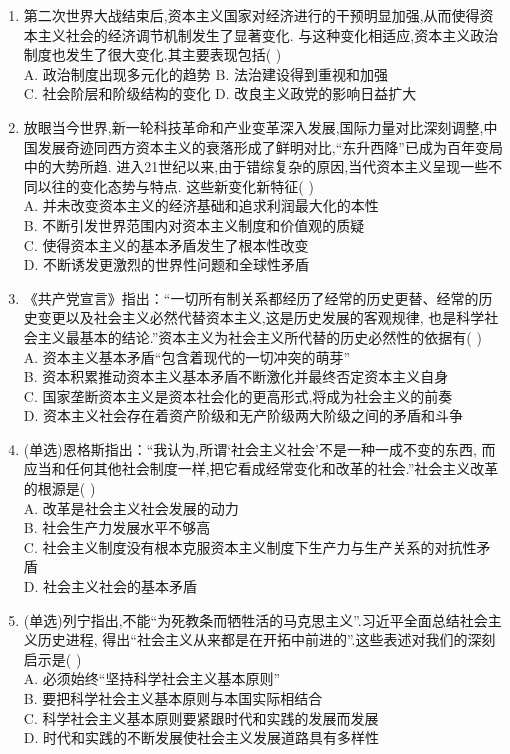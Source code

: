 \documentclass[12pt, a4paper, oneside, UTF8]{ctexbook}
\begin{document}
\begin{enumerate}
    \item 第二次世界大战结束后,资本主义国家对经济进行的干预明显加强,从而使得资本主义社会的经济调节机制发生了显著变化.
    与这种变化相适应,资本主义政治制度也发生了很大变化.其主要表现包括(   ) \\
    A. 政治制度出现多元化的趋势 \qquad
    B. 法治建设得到重视和加强 \\
    C. 社会阶层和阶级结构的变化 \qquad
    D. 改良主义政党的影响日益扩大

    \item 放眼当今世界,新一轮科技革命和产业变革深入发展,国际力量对比深刻调整,中国发展奇迹同西方资本主义的衰落形成了鲜明对比,“东升西降”已成为百年变局中的大势所趋.
    进入21世纪以来,由于错综复杂的原因,当代资本主义呈现一些不同以往的变化态势与特点.
    这些新变化新特征(   ) \\
    A. 并未改变资本主义的经济基础和追求利润最大化的本性\\
    B. 不断引发世界范围内对资本主义制度和价值观的质疑\\
    C. 使得资本主义的基本矛盾发生了根本性改变\\
    D. 不断诱发更激烈的世界性问题和全球性矛盾

    \item 《共产党宣言》指出：“一切所有制关系都经历了经常的历史更替、经常的历史变更以及社会主义必然代替资本主义,这是历史发展的客观规律,
    也是科学社会主义最基本的结论.”资本主义为社会主义所代替的历史必然性的依据有(   ) \\
    A. 资本主义基本矛盾“包含着现代的一切冲突的萌芽” \\
    B. 资本积累推动资本主义基本矛盾不断激化并最终否定资本主义自身 \\
    C. 国家垄断资本主义是资本社会化的更高形式,将成为社会主义的前奏 \\
    D. 资本主义社会存在着资产阶级和无产阶级两大阶级之间的矛盾和斗争

    \item (单选)恩格斯指出：“我认为,所谓‘社会主义社会’不是一种一成不变的东西,
    而应当和任何其他社会制度一样,把它看成经常变化和改革的社会.”社会主义改革的根源是(   ) \\
    A. 改革是社会主义社会发展的动力 \\
    B. 社会生产力发展水平不够高 \\
    C. 社会主义制度没有根本克服资本主义制度下生产力与生产关系的对抗性矛盾 \\
    D. 社会主义社会的基本矛盾 

    \item (单选)列宁指出,不能“为死教条而牺牲活的马克思主义”.习近平全面总结社会主义历史进程,
    得出“社会主义从来都是在开拓中前进的”.这些表述对我们的深刻启示是(   ) \\
    A. 必须始终“坚持科学社会主义基本原则” \\
    B. 要把科学社会主义基本原则与本国实际相结合 \\
    C. 科学社会主义基本原则要紧跟时代和实践的发展而发展 \\
    D. 时代和实践的不断发展使社会主义发展道路具有多样性


\end{enumerate}
\end{document}
